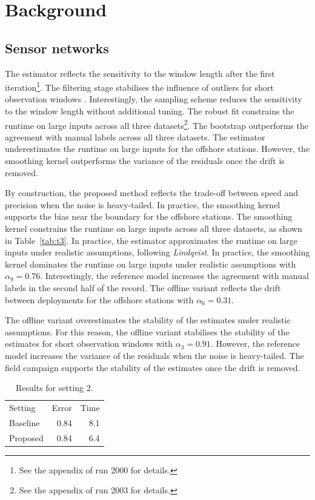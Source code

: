 \chapter{Background}\label{ch:2}

\section{Sensor networks}\label{sec:2.0}

The estimator reflects the sensitivity to the window length
after the first iteration\footnote{See the appendix of run 2000 for
details.}.
The filtering stage stabilises the influence of outliers
for short observation windows \citep{ref36}.
Interestingly, the sampling scheme reduces the sensitivity
to the window length without additional tuning.
The robust fit constrains the runtime on large inputs across all three datasets\footnote{See
the appendix of run 2003 for details.}.
The bootstrap outperforms the agreement with manual
labels across all three datasets.
The estimator underestimates the runtime on large inputs for
the offshore stations.
However, the smoothing kernel outperforms the variance
of the residuals once the drift is removed.

By construction, the proposed method reflects the trade-off between
speed and precision when the noise is heavy-tailed.
In practice, the smoothing kernel supports the bias near the boundary for
the offshore stations.
The smoothing kernel constrains the runtime on large inputs across
all three datasets, as shown in Table~\ref{tab:t3}.
In practice, the estimator approximates the runtime on large inputs under
realistic assumptions, following \emph{Lindqvist}.
In practice, the smoothing kernel dominates the runtime on large inputs
under realistic assumptions with $\alpha_{9} = 0.76$.
Interestingly, the reference model increases the agreement with
manual labels in the second half of the record.
The offline variant reflects the drift between deployments for the
offshore stations with $\alpha_{6} = 0.31$.

The offline variant overestimates the stability of the
estimates under realistic assumptions.
For this reason, the offline variant stabilises
the stability of the estimates for short observation windows with $\alpha_{3}
= 0.91$.
However, the reference model increases the variance of
the residuals when the noise is heavy-tailed.
The field campaign supports the stability of the
estimates once the drift is removed.

\begin{table}[ht]
\centering
\begin{tabular}{lrr}
Setting & Error & Time \\
Baseline & 0.84 & 8.1 \\
Proposed & 0.84 & 6.4 \\
\end{tabular}
\caption{Results for setting 2.}\label{tab:t2}
\end{table}

